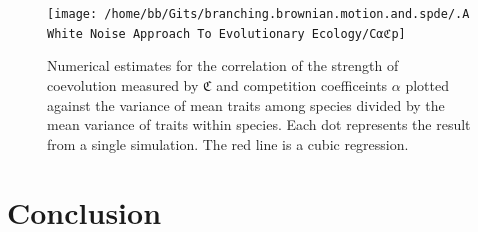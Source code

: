 \documentclass[]{article}
\begin{document}
\begin{figure}

{\centering \texttt{[image: /home/bb/Gits/branching.brownian.motion.and.spde/.A White Noise Approach To Evolutionary Ecology/Cαℭp]} 

}

\caption{\label{cor_coev_fig}Numerical estimates for the correlation of the strength of coevolution measured by $\mathfrak{C}$ and competition coefficeints $\alpha$ plotted against the variance of mean traits among species divided by the mean variance of traits within species. Each dot represents the result from a single simulation. The red line is a cubic regression.}\label{fig:unnamed-chunk-12}
\end{figure}

\hypertarget{conclusion}{%
\section{\texorpdfstring{Conclusion
\label{conclusion}}{Conclusion }}\label{conclusion}}
\end{document}
